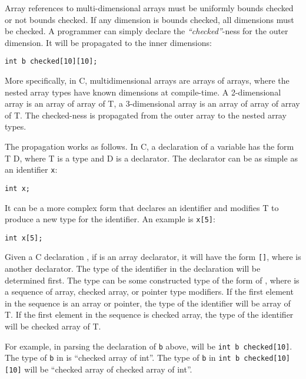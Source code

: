 Array references to multi-dimensional arrays must be uniformly bounds
checked or not bounds checked. If any dimension is bounds checked, all
dimensions must be checked. A programmer can simply declare the
\emph{``checked''}-ness for the outer dimension. It will be propagated
to the inner dimensions:

\begin{verbatim}
int b checked[10][10];
\end{verbatim}

More specifically, in C, multidimensional arrays are arrays of arrays,
where the nested array types have known dimensions at compile-time. A
2-dimensional array is an array of array of T, a 3-dimensional array is
an array of array of array of T. The checked-ness is propagated from the
outer array to the nested array types.

The propagation works as follows. In C, a declaration of a variable has
the form T D, where T is a type and D is a declarator. The declarator
can be as simple as an identifier \texttt{x}:
\begin{verbatim}
int x;
\end{verbatim}

It can be a more complex form that declares an identifier and modifies T
to produce a new type for the identifier. An example is \texttt{x[5]}:

\begin{verbatim}
int x[5];
\end{verbatim}

Given a C declaration  , if  is an array
declarator, it will have the form
\texttt{[]},
where  is another declarator. The type of the identifier in the
declaration  will be determined first. The type can be some
constructed type of the form  of , where
 is a sequence of array, checked array, or pointer
type modifiers. If the first element in the 
sequence is an array or pointer, the type of the identifier will be
 array of T. If the first element in the
 sequence is checked array, the type of the
identifier will be  checked array of T.

For example, in parsing the declaration of \texttt{b} above, 
will be \texttt{int b checked[10]}. The type of \texttt{b} in
 is ``checked array of int''. The type of \texttt{b} in
\texttt{int b checked[10][10]} will be ``checked array of
checked array of int''.

